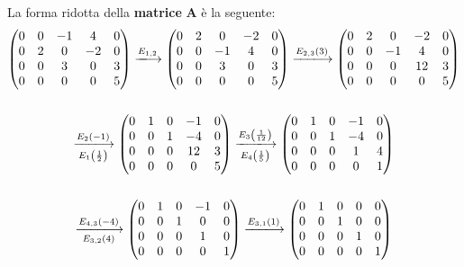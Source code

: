 \documentclass[a4paper]{article}
\makeatletter
\newenvironment{rowequmat}[1]{\left(\array{@{}#1@{}}}{\endarray\right)}
\makeatother
\begin{document}
	\noindent
	La forma ridotta della \textbf{matrice} $\boldsymbol{A}$ è la seguente:
	\begin{gather*}
		\begin{rowequmat}{ccccc}
			0 & 0 & -1 & 4 & 0 \\
			0 & 2 & 0 & -2 & 0 \\
			0 & 0 & 3 & 0 & 3 \\
			0 & 0 & 0 & 0 & 5
		\end{rowequmat} \xlongrightarrow{E_{1,2}}
		\begin{rowequmat}{ccccc}
			0 & 2 & 0 & -2 & 0 \\
			0 & 0 & -1 & 4 & 0 \\
			0 & 0 & 3 & 0 & 3 \\
			0 & 0 & 0 & 0 & 5
		\end{rowequmat} \xlongrightarrow{E_{2,3}\left(3\right)}
		\begin{rowequmat}{ccccc}
			0 & 2 & 0 & -2 & 0 \\
			0 & 0 & -1 & 4 & 0 \\
			0 & 0 & 0 & 12 & 3 \\
			0 & 0 & 0 & 0 & 5
		\end{rowequmat} \\
		\\
		\xlongrightarrow[E_{1}\left(\frac{1}{2}\right)]{E_{2}\left(-1\right)}
		\begin{rowequmat}{ccccc}
			0 & 1 & 0 & -1 & 0 \\
			0 & 0 & 1 & -4 & 0 \\
			0 & 0 & 0 & 12 & 3 \\
			0 & 0 & 0 & 0 & 5
		\end{rowequmat} \xlongrightarrow[E_{4}\left(\frac{1}{5}\right)]{E_{3}\left(\frac{1}{12}\right)}
		\begin{rowequmat}{ccccc}
			0 & 1 & 0 & -1 & 0 \\
			0 & 0 & 1 & -4 & 0 \\
			0 & 0 & 0 & 1 & 4 \\
			0 & 0 & 0 & 0 & 1
		\end{rowequmat} \\
		\\
		\xlongrightarrow[E_{3,2}\left(4\right)]{E_{4,3}\left(-4\right)}
		\begin{rowequmat}{ccccc}
			0 & 1 & 0 & -1 & 0 \\
			0 & 0 & 1 & 0 & 0 \\
			0 & 0 & 0 & 1 & 0 \\
			0 & 0 & 0 & 0 & 1
		\end{rowequmat} \xlongrightarrow{E_{3,1}\left(1\right)}
		\begin{rowequmat}{ccccc}
			0 & 1 & 0 & 0 & 0 \\
			0 & 0 & 1 & 0 & 0 \\
			0 & 0 & 0 & 1 & 0 \\
			0 & 0 & 0 & 0 & 1
		\end{rowequmat}
	\end{gather*}
\end{document}
